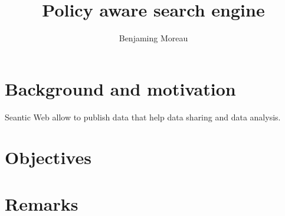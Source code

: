 \documentclass{llncs}
\begin{document}
%
\mainmatter              %
%
\title{Policy aware search engine}

%
\author{Benjaming Moreau}
%

\maketitle              %

%

\section*{Background and motivation}

Seantic Web allow to publish data that help data sharing and data analysis. 

\section*{Objectives}

\section*{Remarks}




\end{document}
